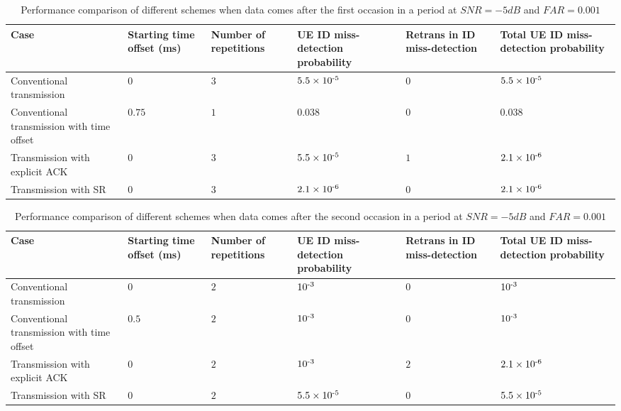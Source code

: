 \documentclass[conference]{IEEEtran}
\begin{document}
\begin{table}[htbp]
\caption{Performance comparison of different schemes when data comes after the first occasion in a period at $SNR = -5dB$ and $FAR = 0.001$}
\begin{center}
\begin{tabular}{|p{5em}|p{3em}|p{3em}|p{3.2em}|p{3em}|p{3.2em}|}
 \hline
 \textbf{Case} & \textbf{Starting time offset (ms)}&\textbf{Number of repetitions}&\textbf{UE ID miss-detection probability}&\textbf{Retrans in ID miss-detection}&\textbf{Total UE ID miss-detection probability}\\
 \hline
 Conventional transmission&$0$&$3$&$5.5\times10\textsuperscript{-5}$&$0$&$5.5\times10\textsuperscript{-5}$\\
 \hline
 Conventional transmission with time offset&$0.75$&$1$&$0.038$&$0$&$0.038$\\
 \hline
Transmission with explicit ACK&$0$&$3$&$5.5\times10\textsuperscript{-5}$&$1$&$2.1\times10\textsuperscript{-6}$\\
\hline
Transmission with SR&$0$&$3$&$2.1\times10\textsuperscript{-6}$&$0$&$2.1\times10\textsuperscript{-6}$\\
 \hline
\end{tabular}
\label{tab3}
\end{center}
\vspace{-7mm}
\end{table}

\begin{table}[htbp]
\caption{Performance comparison of different schemes when data comes after the second occasion in a period at $SNR = -5dB$ and $FAR = 0.001$}
\begin{center}
\begin{tabular}{|p{5em}|p{3em}|p{3em}|p{3.2em}|p{3em}|p{3.2em}|}
 \hline
 \textbf{Case} & \textbf{Starting time offset (ms)}&\textbf{Number of repetitions}&\textbf{UE ID miss-detection probability}&\textbf{Retrans in ID miss-detection}&\textbf{Total UE ID miss-detection probability}\\
 \hline
 Conventional transmission&$0$&$2$&$10\textsuperscript{-3}$&$0$&$10\textsuperscript{-3}$\\
 \hline
 Conventional transmission with time offset&$0.5$&$2$&$10\textsuperscript{-3}$&$0$&$10\textsuperscript{-3}$\\
 \hline
Transmission with explicit ACK&$0$&$2$&$10\textsuperscript{-3}$&$2$&$2.1\times10\textsuperscript{-6}$\\
\hline
Transmission with SR&$0$&$2$&$5.5\times10\textsuperscript{-5}$&$0$&$5.5\times10\textsuperscript{-5}$\\
 \hline
\end{tabular}
\label{tab4}
\end{center}
\vspace{-7mm}
\end{table}
\end{document}
